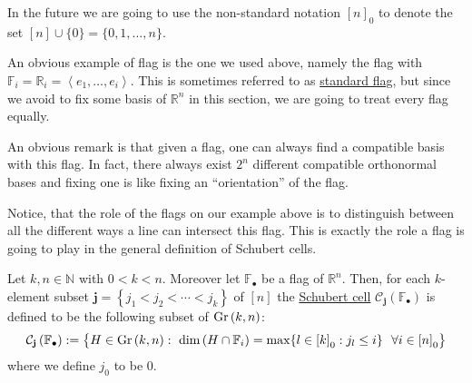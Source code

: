 In the future we are going to use the non-standard notation ${[n]}_0$ to denote the set $[n]\cup\{0\}=\{0,1,\ldots,n\}$.

An obvious example of flag is the one we used above, namely the flag with $\mathbb{F}_i=\mathbb{R}_i=\left<e_1,\ldots,e_i\right>$. This is sometimes referred to as \ul{standard flag}, but since we avoid to fix some basis of $\mathbb{R}^n$ in this section, we are going to treat every flag equally.

An obvious remark is that given a flag, one can always find a compatible basis with this flag. In fact, there always exist $2^n$ different compatible orthonormal bases and fixing one is like fixing an ``orientation'' of the flag.

Notice, that the role of the flags on our example above is to distinguish between all the different ways a line can intersect this flag. This is exactly the role a flag is going to play in the general definition of Schubert cells.

\begin{definition} Let $k,n\in\mathbb{N}$ with $0<k<n$. Moreover let $\mathbb{F}_{\bullet}$ be a flag of $\mathbb{R}^n$. Then, for each $k$-element subset $\mathbf{j}=\left\{j_1<j_2<\cdots<j_k\right\}$ of $[n]$ the \ul{Schubert cell} $\mathcal{C}_{\mathbf{j}}\left(\mathbb{F}_{\bullet}\right)$ is defined to be the following subset of $\Gr{k}{n}$:
\[\mathcal{C}_{\mathbf{j}}\left(\mathbb{F}_{\bullet}\right):=\big\{H\in\Gr{k}{n}:\ \dim\left(H\cap\mathbb{F}_i\right)=\max\{l\in{[k]}_0:j_l\leq i\}\ \ \forall i\in{[n]}_0\big\}\]
where we define $j_0$ to be $0$.
\end{definition}

